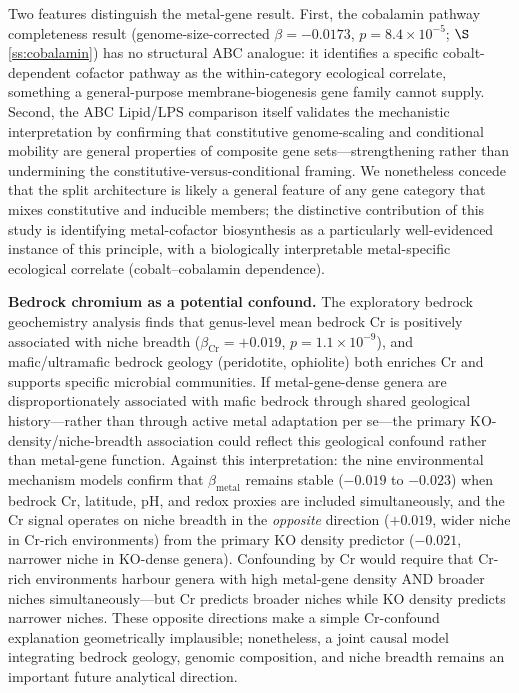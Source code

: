 \documentclass[times]{zHenriquesLab-StyleBioRxiv}
\begin{document}
Two features distinguish the metal-gene result. First, the cobalamin pathway
completeness result (genome-size-corrected $\beta = -0.0173$, $p = 8.4 \times
10^{-5}$; $\S$\ref{ss:cobalamin}) has no structural ABC analogue: it identifies
a specific cobalt-dependent cofactor pathway as the within-category ecological
correlate, something a general-purpose membrane-biogenesis gene family cannot
supply. Second, the ABC Lipid/LPS comparison itself validates the mechanistic
interpretation by confirming that constitutive genome-scaling and conditional
mobility are general properties of composite gene sets---strengthening rather
than undermining the constitutive-versus-conditional framing. We nonetheless
concede that the split architecture is likely a general feature of any gene
category that mixes constitutive and inducible members; the distinctive
contribution of this study is identifying metal-cofactor biosynthesis as a
particularly well-evidenced instance of this principle, with a biologically
interpretable metal-specific ecological correlate (cobalt--cobalamin dependence).

\textbf{Bedrock chromium as a potential confound.} The exploratory bedrock
geochemistry analysis finds that genus-level mean bedrock Cr is positively
associated with niche breadth ($\beta_\mathrm{Cr} = +0.019$,
$p = 1.1 \times 10^{-9}$), and mafic/ultramafic bedrock geology (peridotite,
ophiolite) both enriches Cr and supports specific microbial communities. If
metal-gene-dense genera are disproportionately associated with mafic bedrock
through shared geological history---rather than through active metal adaptation
per se---the primary KO-density/niche-breadth association could reflect this
geological confound rather than metal-gene function. Against this
interpretation: the nine environmental mechanism models confirm that
$\beta_\mathrm{metal}$ remains stable ($-0.019$ to $-0.023$) when bedrock Cr,
latitude, pH, and redox proxies are included simultaneously, and the Cr signal
operates on niche breadth in the \emph{opposite} direction ($+0.019$, wider
niche in Cr-rich environments) from the primary KO density predictor ($-0.021$,
narrower niche in KO-dense genera). Confounding by Cr would require that
Cr-rich environments harbour genera with high metal-gene density AND broader
niches simultaneously---but Cr predicts broader niches while KO density predicts
narrower niches. These opposite directions make a simple Cr-confound explanation
geometrically implausible; nonetheless, a joint causal model integrating bedrock
geology, genomic composition, and niche breadth remains an important future
analytical direction.
\end{document}

